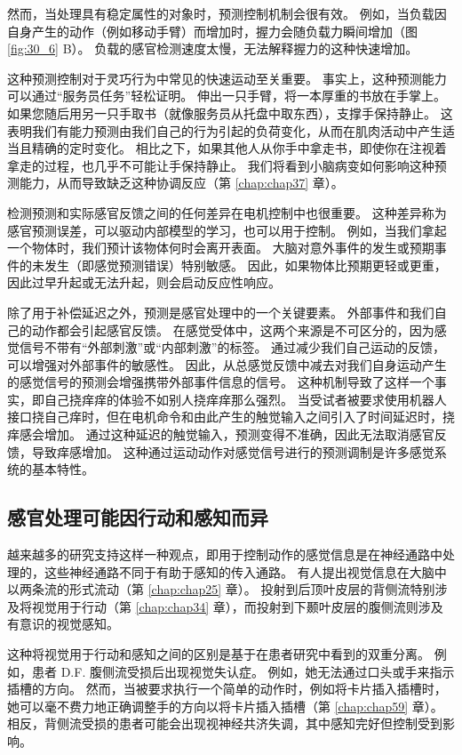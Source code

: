 然而，当处理具有稳定属性的对象时，预测控制机制会很有效。
例如，当负载因自身产生的动作（例如移动手臂）而增加时，握力会随负载力瞬间增加（图 \ref{fig:30_6} B）。
负载的感官检测速度太慢，无法解释握力的这种快速增加。


这种预测控制对于灵巧行为中常见的快速运动至关重要。 事实上，这种预测能力可以通过“服务员任务”轻松证明。 
伸出一只手臂，将一本厚重的书放在手掌上。
如果您随后用另一只手取书（就像服务员从托盘中取东西），支撑手保持静止。
这表明我们有能力预测由我们自己的行为引起的负荷变化，从而在肌肉活动中产生适当且精确的定时变化。
相比之下，如果其他人从你手中拿走书，即使你在注视着拿走的过程，也几乎不可能让手保持静止。
我们将看到小脑病变如何影响这种预测能力，从而导致缺乏这种协调反应（第 \ref{chap:chap37} 章）。


检测预测和实际感官反馈之间的任何差异在电机控制中也很重要。
这种差异称为感官预测误差，可以驱动内部模型的学习，也可以用于控制。
例如，当我们拿起一个物体时，我们预计该物体何时会离开表面。
大脑对意外事件的发生或预期事件的未发生（即感觉预测错误）特别敏感。
因此，如果物体比预期更轻或更重，因此过早升起或无法升起，则会启动反应性响应。


除了用于补偿延迟之外，预测是感官处理中的一个关键要素。
外部事件和我们自己的动作都会引起感官反馈。
在感觉受体中，这两个来源是不可区分的，因为感觉信号不带有“外部刺激”或“内部刺激”的标签。
通过减少我们自己运动的反馈，可以增强对外部事件的敏感性。
因此，从总感觉反馈中减去对我们自身运动产生的感觉信号的预测会增强携带外部事件信息的信号。
这种机制导致了这样一个事实，即自己挠痒痒的体验不如别人挠痒痒那么强烈。
当受试者被要求使用机器人接口挠自己痒时，但在电机命令和由此产生的触觉输入之间引入了时间延迟时，挠痒感会增加。
通过这种延迟的触觉输入，预测变得不准确，因此无法取消感官反馈，导致痒感增加。
这种通过运动动作对感觉信号进行的预测调制是许多感觉系统的基本特性。


\subsection{感官处理可能因行动和感知而异}

越来越多的研究支持这样一种观点，即用于控制动作的感觉信息是在神经通路中处理的，这些神经通路不同于有助于感知的传入通路。
有人提出视觉信息在大脑中以两条流的形式流动（第 \ref{chap:chap25} 章）。
投射到后顶叶皮层的背侧流特别涉及将视觉用于行动（第 \ref{chap:chap34} 章），而投射到下颞叶皮层的腹侧流则涉及有意识的视觉感知。


这种将视觉用于行动和感知之间的区别是基于在患者研究中看到的双重分离。
例如，患者 D.F. 腹侧流受损后出现视觉失认症。
例如，她无法通过口头或手来指示插槽的方向。
然而，当被要求执行一个简单的动作时，例如将卡片插入插槽时，她可以毫不费力地正确调整手的方向以将卡片插入插槽（第 \ref{chap:chap59} 章）。
相反，背侧流受损的患者可能会出现视神经共济失调，其中感知完好但控制受到影响。



